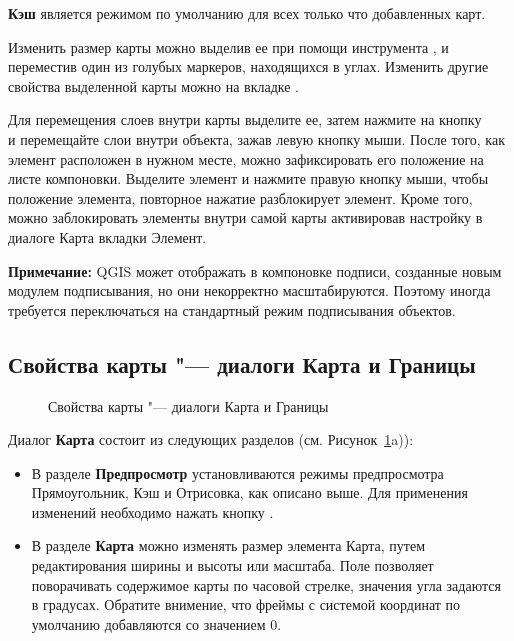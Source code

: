 \textbf{Кэш} является режимом по умолчанию для всех только что
добавленных карт.

Изменить размер карты можно выделив ее при помощи инструмента
,
и переместив один из голубых маркеров, находящихся в углах. Изменить
другие свойства выделенной карты можно на вкладке .

Для перемещения слоев внутри карты выделите ее, затем нажмите на кнопку \\
 и
перемещайте слои внутри объекта, зажав левую кнопку мыши.
После того, как элемент расположен в нужном месте, можно зафиксировать
его положение на листе компоновки. Выделите элемент и нажмите правую
кнопку мыши, чтобы  положение
элемента, повторное нажатие разблокирует элемент. Кроме того, можно
заблокировать элементы внутри самой карты активировав настройку
 в диалоге Карта вкладки
Элемент.

\textbf{Примечание:} QGIS \CURRENT может отображать в компоновке подписи,
созданные новым модулем подписывания, но они некорректно масштабируются.
Поэтому иногда требуется переключаться на стандартный режим подписывания
объектов.

\subsection{Свойства карты "--- диалоги Карта и Границы}

\begin{figure}[ht]
  \centering
    \hspace{1cm}
  \caption{Свойства карты "--- диалоги Карта и Границы \nixcaption}\label{fig:mapdialog}
\end{figure}


Диалог \textbf{Карта} состоит из следующих разделов
(см. Рисунок~\ref{fig:mapdialog}a)):

\begin{itemize}[label=--]
\item В разделе \textbf{Предпросмотр} установливаются режимы
предпросмотра Прямоугольник, Кэш и Отрисовка, как описано выше. Для
применения изменений необходимо нажать кнопку .
\item В разделе \textbf{Карта} можно изменять размер элемента Карта,
путем редактирования ширины и высоты или масштаба. Поле
 позволяет поворачивать содержимое карты
по часовой стрелке, значения угла задаются в градусах. Обратите
внимение, что фреймы с системой координат по умолчанию добавляются со
значением 0.
\end{itemize}

